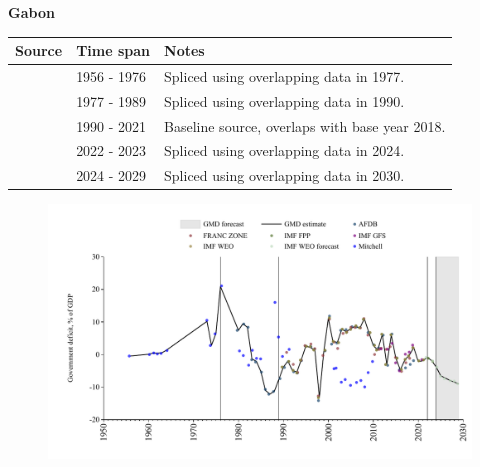 \documentclass[12pt,a4paper,landscape]{article}
\begin{document}
\begin{adjustbox}{max totalsize={\paperwidth}{\paperheight},center}
\begin{minipage}[t][\textheight][t]{\textwidth}
\vspace*{0.5cm}
{}
\begin{center}
{\Large\bfseries Gabon}
\end{center}
\vspace{0.5cm}
\begin{table}[H]
\centering
\small
\begin{tabular}{|l|l|l|}
\hline
\textbf{Source} & \textbf{Time span} & \textbf{Notes} \\
\hline
\rowcolor{white}\cite{Mitchell}& 1956 - 1976 &Spliced using overlapping data in 1977.\\
\rowcolor{lightgray}\cite{AFDB}& 1977 - 1989 &Spliced using overlapping data in 1990.\\
\rowcolor{white}\cite{IMF_WEO}& 1990 - 2021 &Baseline source, overlaps with base year 2018.\\
\rowcolor{lightgray}\cite{IMF_FPP}& 2022 - 2023 &Spliced using overlapping data in 2024.\\
\rowcolor{white}\cite{IMF_WEO_forecast}& 2024 - 2029 &Spliced using overlapping data in 2030.\\
\hline
\end{tabular}
\end{table}
\begin{figure}[H]
\centering
\includegraphics[width=\textwidth,height=0.6\textheight,keepaspectratio]{graphs/GAB_govdef_GDP.pdf}
\end{figure}
\end{minipage}
\end{adjustbox}
\end{document}
